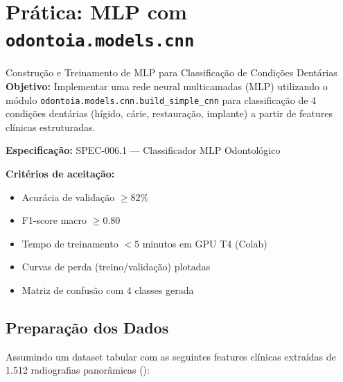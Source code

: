 
\section{Prática: MLP com \texttt{odontoia.models.cnn}}
\label{sec:pratica-mlp}

\niveltres

\begin{pratica}{Construção e Treinamento de MLP para Classificação de
Condições Dentárias}
  \textbf{Objetivo:} Implementar uma rede neural multicamadas (MLP) utilizando
  o módulo \texttt{odontoia.models.cnn.build\_simple\_cnn} para classificação
  de 4 condições dentárias (hígido, cárie, restauração, implante) a partir de
  features clínicas estruturadas.

  \textbf{Especificação:} SPEC-006.1 --- Classificador MLP Odontológico

  \textbf{Critérios de aceitação:}
  \begin{itemize}
    \item Acurácia de validação $\geq 82\%$
    \item F1-score macro $\geq 0.80$
    \item Tempo de treinamento $< 5$ minutos em GPU T4 (Colab)
    \item Curvas de perda (treino/validação) plotadas
    \item Matriz de confusão com 4 classes gerada
  \end{itemize}
\end{pratica}

\subsection{Preparação dos Dados}

Assumindo um dataset tabular com as seguintes features clínicas extraídas de
1.512 radiografias panorâmicas ():

